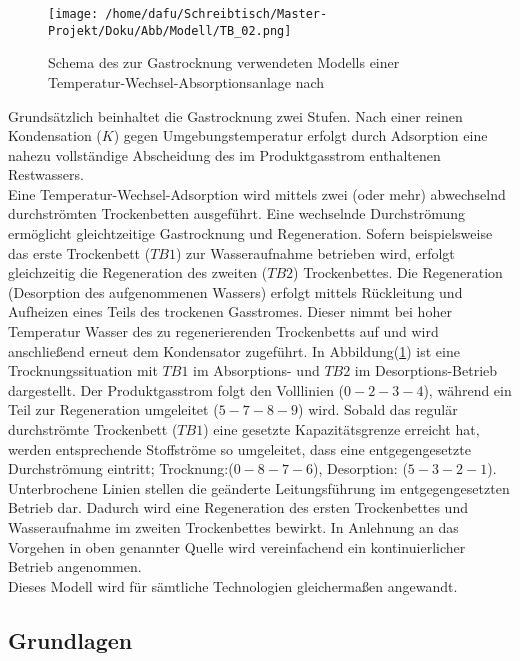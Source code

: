 \documentclass[onecolumn,10pt,titlepage]{article}
\begin{document}
\begin{figure}[H]

	\centering

	\texttt{[image: /home/dafu/Schreibtisch/Master-Projekt/Doku/Abb/Modell/TB\_02.png]}
	\caption[Schema: Gastrocknung]{Schema des zur Gastrocknung verwendeten Modells einer Temperatur-Wechsel-Absorptionsanlage nach \cite{Tjarks2017}}
	\label{fig:schema_TB}
\end{figure}
Grundsätzlich beinhaltet die Gastrocknung zwei Stufen. Nach einer reinen Kondensation ($K$) gegen Umgebungstemperatur erfolgt durch Adsorption eine nahezu vollständige Abscheidung des im Produktgasstrom enthaltenen Restwassers.\\
Eine Temperatur-Wechsel-Adsorption wird mittels zwei (oder mehr) abwechselnd durchströmten Trockenbetten ausgeführt. Eine wechselnde Durchströmung ermöglicht gleichtzeitige Gastrocknung und Regeneration. Sofern beispielsweise das erste Trockenbett ($TB1$) zur Wasseraufnahme betrieben wird, erfolgt gleichzeitig die Regeneration des zweiten ($TB2$) Trockenbettes. Die Regeneration (Desorption des aufgenommenen Wassers) erfolgt mittels Rückleitung und Aufheizen eines Teils des trockenen Gasstromes. Dieser nimmt bei hoher Temperatur Wasser des zu regenerierenden Trockenbetts auf und wird anschließend erneut dem Kondensator zugeführt.
In Abbildung(\ref{fig:schema_TB}) ist eine Trocknungssituation mit $TB1$ im Absorptions- und $TB2$ im Desorptions-Betrieb dargestellt. Der Produktgasstrom folgt den Volllinien ($0 -2-3-4$), während ein Teil zur Regeneration  umgeleitet ($5-7-8-9$) wird. Sobald das regulär durchströmte Trockenbett ($TB1$) eine gesetzte Kapazitätsgrenze erreicht hat, werden entsprechende Stoffströme so umgeleitet, dass eine entgegengesetzte Durchströmung eintritt; Trocknung:($0-8-7-6$), Desorption: ($5-3-2-1$). Unterbrochene Linien stellen die geänderte Leitungsführung im entgegengesetzten Betrieb dar. Dadurch wird eine Regeneration des ersten Trockenbettes und Wasseraufnahme im zweiten Trockenbettes bewirkt.
In Anlehnung an das Vorgehen in oben genannter Quelle wird vereinfachend ein kontinuierlicher Betrieb angenommen.\\
Dieses Modell wird für sämtliche Technologien gleichermaßen angewandt.

\subsection{Grundlagen}
\end{document}
